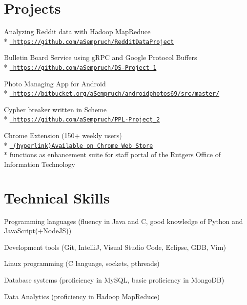 \documentclass[letterpaper]{article}
\renewenvironment{itemize}{
  \begin{list}{}{
      \setlength{\leftmargin}{1.5em}
    }
  }{
  \end{list}
}
\begin{document}
\section*{Projects}

\begin{itemize}
  \setlength{\parskip}{2pt}
  \item Analyzing Reddit data with Hadoop MapReduce \\*
  \href{https://github.com/aSempruch/RedditDataProject}{\tt
  https://github.com/aSempruch/RedditDataProject}
  \item Bulletin Board Service using gRPC and Google Protocol Buffers \\*
  \href{https://github.com/aSempruch/DS-Project_1}{\tt
  https://github.com/aSempruch/DS-Project\_1}

  \item Photo Managing App for Android \\*
  \href{https://bitbucket.org/aSempruch/androidphotos69/src/master/}{\tt
  https://bitbucket.org/aSempruch/androidphotos69/src/master/}

  \item Cypher breaker written in Scheme \\*
  \href{https://github.com/aSempruch/PPL-Project_2}{\tt
  https://github.com/aSempruch/PPL-Project\_2}

  \item Chrome Extension (150+ weekly users) \\*
  \href{https://chrome.google.com/webstore/detail/zedder/oclfiknhggkgkhibknacdlniepkggbal?hl=en}{\tt
  (hyperlink)Available on Chrome Web Store} \\*
  functions as enhancement suite for staff portal of the Rutgers Office of Information Technology

\end{itemize}

\section*{Technical Skills}

\begin{itemize} 
\hyphenchar{}
\setlength{\parskip}{1pt}
\item Programming languages (fluency in Java and C,
  good knowledge of Python and JavaScript(+NodeJS))

\item Development tools (Git, IntelliJ, Visual Studio Code, Eclipse, GDB, Vim)

\item Linux programming (C language, sockets, pthreads)

\item Database systems (proficiency in MySQL, basic proficiency in MongoDB)

\item Data Analytics (proficiency in Hadoop MapReduce)


\end{itemize}
\end{document}

